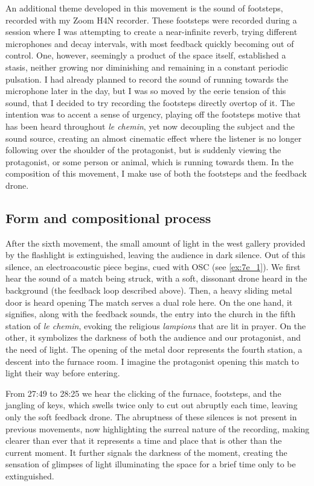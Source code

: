 \documentclass[12pt,twoside,maitrise]{dms_ks}
\theoremstyle{definition}
\begin{document}
{An additional theme developed in this movement is the sound of footsteps, recorded with my Zoom H4N recorder. 
These footsteps were recorded during a session where I was attempting to create a near-infinite reverb, trying different microphones and decay intervals, with most feedback quickly becoming out of control. 
One, however, seemingly a product of the space itself, established a stasis, neither growing nor diminishing and remaining in a constant periodic pulsation. 
I had already planned to record the sound of running towards the microphone later in the day, but I was so moved by the eerie tension of this sound, that I decided to try recording the footsteps directly overtop of it. 
The intention was to accent a sense of urgency, playing off the footsteps motive that has been heard throughout \textit{le chemin}, yet now decoupling the subject and the sound source, creating an almost cinematic effect where the listener is no longer following over the shoulder of the protagonist, but is suddenly viewing the protagonist, or some person or animal, which is running towards them. 
In the composition of this movement, I make use of both the footsteps and the feedback drone.

\subsection{Form and compositional process}

After the sixth movement, the small amount of light in the west gallery provided by the flashlight is extinguished, leaving the audience in dark silence. 
Out of this silence, an electroacoustic piece begins, cued with OSC (see \cref{ex:7e_1}). 
We first hear the sound of a match being struck, with a soft, dissonant drone heard in the background (the feedback loop described above). 
Then, a heavy sliding metal door is heard opening
The match serves a dual role here.
On the one hand, it signifies, along with the feedback sounds, the entry into the church in the fifth station of \textit{le chemin}, evoking the religious \textit{lampions} that are lit in prayer.
On the other, it symbolizes the darkness of both the audience and our protagonist, and the need of light.
The opening of the metal door represents the fourth station, a descent into the furnace room.
I imagine the protagonist opening this match to light their way before entering.

From 27:49 to 28:25 we hear the clicking of the furnace, footsteps, and the jangling of keys, which swells twice only to cut out abruptly each time, leaving only the soft feedback drone. 
The abruptness of these silences is not present in previous movements, now highlighting the surreal nature of the recording, making clearer than ever that it represents a time and place that is other than the current moment. 
It further signals the darkness of the moment, creating the sensation of glimpses of light illuminating the space for a brief time only to be extinguished. 

}
\end{document}

